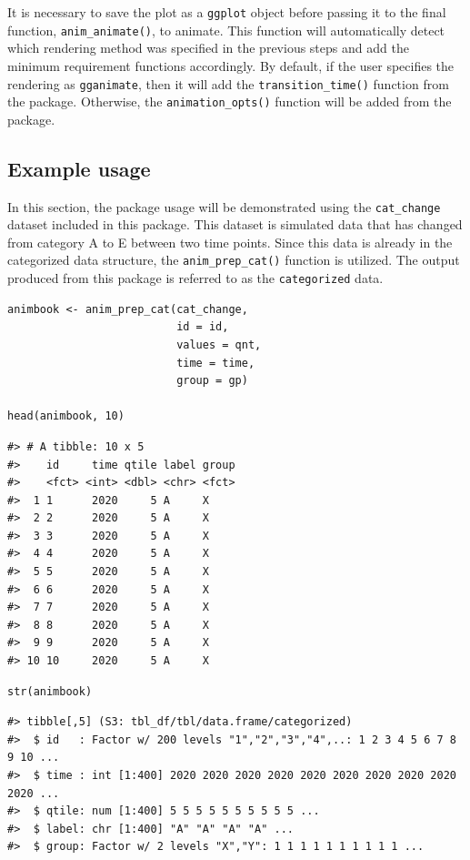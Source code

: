 It is necessary to save the plot as a \texttt{ggplot} object before passing it to the final function, \texttt{anim\_animate()}, to animate. This function will automatically detect which rendering method was specified in the previous steps and add the minimum requirement functions accordingly. By default, if the user specifies the rendering as \texttt{gganimate}, then it will add the \texttt{transition\_time()} function from the  package. Otherwise, the \texttt{animation\_opts()} function will be added from the  package.

\hypertarget{example-usage}{%
\subsection{Example usage}\label{example-usage}}

In this section, the package usage will be demonstrated using the \texttt{cat\_change} dataset included in this package. This dataset is simulated data that has changed from category A to E between two time points. Since this data is already in the categorized data structure, the \texttt{anim\_prep\_cat()} function is utilized. The output produced from this package is referred to as the \texttt{categorized} data.

\begin{verbatim}
animbook <- anim_prep_cat(cat_change, 
                          id = id, 
                          values = qnt, 
                          time = time, 
                          group = gp)

head(animbook, 10)
\end{verbatim}

\begin{verbatim}
#> # A tibble: 10 x 5
#>    id     time qtile label group
#>    <fct> <int> <dbl> <chr> <fct>
#>  1 1      2020     5 A     X    
#>  2 2      2020     5 A     X    
#>  3 3      2020     5 A     X    
#>  4 4      2020     5 A     X    
#>  5 5      2020     5 A     X    
#>  6 6      2020     5 A     X    
#>  7 7      2020     5 A     X    
#>  8 8      2020     5 A     X    
#>  9 9      2020     5 A     X    
#> 10 10     2020     5 A     X
\end{verbatim}

\begin{verbatim}
str(animbook)
\end{verbatim}

\begin{verbatim}
#> tibble[,5] (S3: tbl_df/tbl/data.frame/categorized)
#>  $ id   : Factor w/ 200 levels "1","2","3","4",..: 1 2 3 4 5 6 7 8 9 10 ...
#>  $ time : int [1:400] 2020 2020 2020 2020 2020 2020 2020 2020 2020 2020 ...
#>  $ qtile: num [1:400] 5 5 5 5 5 5 5 5 5 5 ...
#>  $ label: chr [1:400] "A" "A" "A" "A" ...
#>  $ group: Factor w/ 2 levels "X","Y": 1 1 1 1 1 1 1 1 1 1 ...
\end{verbatim}

